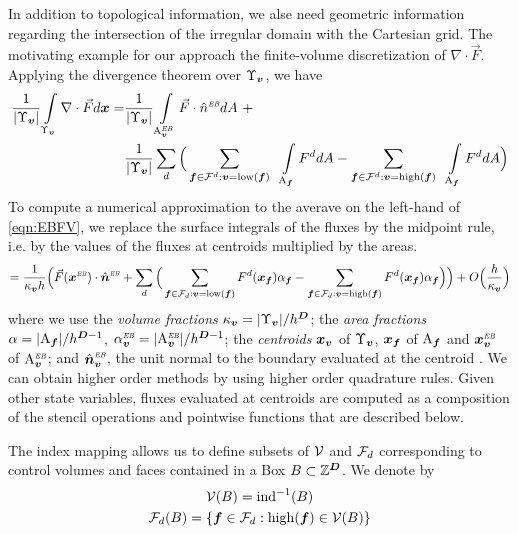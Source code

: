 \documentclass[12pt]{article}
\newcommand{\ind}{{\rm{ind}}}
\newcommand{\low}{{\rm{low}}}
\newcommand{\high}{{\rm{high}}}
\newcommand{\vol}[1]{{\Upsilon_{#1}}}
\newcommand{\area}[1]{{\rm{A}_{#1}}}
\newcommand{\vof}{{\mbf{v}}}
\newcommand{\face}{{\mbf{f}}}
\newcommand{\lr}[1]{{\langle #1 \rangle}}
\newcommand{\ebsub}{{\text{\it \tiny EB}}}
\newcommand{\areaEB}[1]{{{\rm A}_{#1}^{\ebsub}}}
\begin{document}
In addition to topological information, we alse need geometric information regarding the intersection of the irregular domain with the Cartesian grid. The motivating example for our approach the finite-volume discretization of $\nabla \cdot \vec{F}$. Applying the divergence theorem over $\vol{\vof}$, we have
\begin{align}
\frac{1}{|\vol{\vof}|} \int \limits_{\vol{\vof} } \nabla \cdot \vec{F} d \mbf{x} =  & \frac{1}{|\vol{\vof}|} \int \limits_{\areaEB{\vof}} \vec{F} \cdot \hat{n}^\ebsub d A ~ +  \nonumber
\\ & \frac{1}{|\vol{\vof}|} \sum \limits_d \Big ( \sum \limits_{\face \in \mcl{F}^d:\vof = \low(\face)} ~~ \int \limits_{\area{\face}} F^d dA -  \sum \limits_{\face \in \mcl{F}^d :\vof = \high(\face)}  ~~ \int \limits_{\area{\face}} F^d dA \Big )\label{eqn:EBFV} 
\end{align}
To compute a numerical approximation to the averave on the left-hand of \eqref{eqn:EBFV}, we replace the surface integrals of the fluxes by the midpoint rule, i.e. by the values of the fluxes at centroids multiplied by the areas. 
\begin{gather*}
= \frac{1}{\kappa_\vof h}\Big( \vec{F}(\mbf{x}^\ebsub ) \cdot \hat{\mbf{n}}^\ebsub +
\sum \limits_d \Big ( \sum \limits_{\face \in \mcl{F}_d:\vof = \low(\face)} F^d (\mbf{x}_\face ) \alpha_\face -  \sum \limits_{\face \in \mcl{F}_d :\vof = \high(\face)}   F^d (\mbf{x}_\face ) \alpha_\face \Big ) \Big ) + O \Big(\frac{h}{\kappa_\vof} \Big)
\end{gather*}
where we use the {\it volume fractions} $\kappa_\vof = |\vol{\vof} |/h^\DIM$; the {\it area fractions} $\alpha = | \area{\face} | / h^{\DIM-1}$, $\alpha_{\vof}^\ebsub = |\areaEB{\vof} | /  h^{\DIM-1}$; the {\it centroids} $\mbf{x}_\vof$ of $\Upsilon_\vof$,  $\mbf{x}_\face$ of $\area{\face}$ and $\mbf{x}_{\vof}^\ebsub$ of $\areaEB{\vof}$; and $\hat{\mbf{n}}_{\vof}^\ebsub$, the unit normal to the boundary evaluated at the centroid . We can obtain higher order methods by using higher order quadrature rules. Given other state variables, fluxes evaluated at centroids are computed as a composition of the stencil operations and pointwise functions that are described below.

The index mapping allows us to define subsets of ${\mathcal{V}}$ and ${\mathcal{F}}_d$ corresponding to control volumes and faces contained in a Box $B \subset \mathbb{Z}^{\boldsymbol{D}}$. We denote by 
\begin{gather*}
\mcl{V}(B) = \ind^{-1} (B) \\
\mcl{F}_d (B) = \{\face \in \mcl{F}_d: \high (\face ) \in \mcl{V}(B) \}
\end{gather*}
\end{document}
